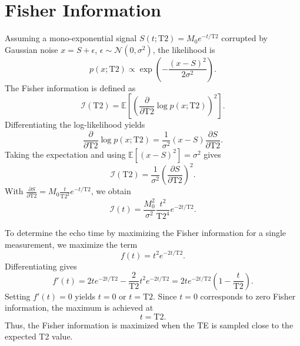\documentclass[preprint,authoryear,12pt]{elsarticle}
\begin{document}
\section{Fisher Information}
\label{sec:annexe2}
Assuming a mono-exponential signal $S(t;\mathrm{T2})=M_0 e^{-t/\mathrm{T2}}$ corrupted by Gaussian noise $x=S+\epsilon$, $\epsilon\sim\mathcal N(0,\sigma^2)$, the likelihood is
\[
p(x;\mathrm{T2})\propto \exp\left(-\frac{(x-S)^2}{2\sigma^2}\right).
\]
The Fisher information is defined as
\[
\mathcal I(\mathrm{T2})=\mathbb{E}\left[\left(\frac{\partial}{\partial \mathrm{T2}}\log p(x;\mathrm{T2})\right)^2\right].
\]
Differentiating the log-likelihood yields
\[
\frac{\partial}{\partial \mathrm{T2}}\log p(x;\mathrm{T2})
=\frac{1}{\sigma^2}(x-S)\frac{\partial S}{\partial \mathrm{T2}}.
\]
Taking the expectation and using $\mathbb{E}[(x-S)^2]=\sigma^2$ gives
\[
\mathcal I(\mathrm{T2})=\frac{1}{\sigma^2}\left(\frac{\partial S}{\partial \mathrm{T2}}\right)^2.
\]
With $\frac{\partial S}{\partial \mathrm{T2}}=M_0 \frac{t}{\mathrm{T2}^2} e^{-t/\mathrm{T2}}$, we obtain
\[
\mathcal I(t)=\frac{M_0^2}{\sigma^2}\frac{t^2}{\mathrm{T2}^4} e^{-2t/\mathrm{T2}}.
\]


To determine the echo time by maximizing the Fisher information for a single measurement, we maximize the term
\begin{equation*}
f(t) = t^2 e^{-2t/\mathrm{T2}}.
\end{equation*}
Differentiating gives
\begin{equation*}
f'(t) = 2t e^{-2t/\mathrm{T2}} - \frac{2}{\mathrm{T2}} t^2 e^{-2t/\mathrm{T2}}
= 2t e^{-2t/\mathrm{T2}} \left(1 - \frac{t}{\mathrm{T2}}\right).
\end{equation*}
Setting $f'(t)=0$ yields $t=0$ or $
t = \mathrm{T2}.$
Since $t=0$ corresponds to zero Fisher information, the maximum is achieved at
\begin{equation*}
t = \mathrm{T2}.
\end{equation*}
Thus, the Fisher information is maximized when the TE is sampled close to the expected T2 value. 
\end{document}
